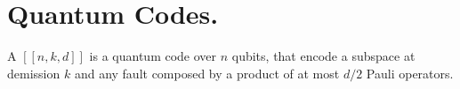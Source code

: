 %
%    

%
%

%

\section{Quantum Codes.}
\begin{definition}
  A $\left[\left[ n,k,d \right]\right]$ is a quantum code over $n$ qubits, that encode a subspace at demission $k$ and any fault composed by a product of at most $d/2$ Pauli operators. 
\end{definition}






